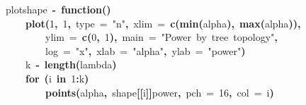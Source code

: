 \documentclass{elsarticle}
\makeatletter
\newcommand{\hlnumber}[1]{\textcolor[rgb]{0,0,0}{#1}}%
\newcommand{\hlfunctioncall}[1]{\textcolor[rgb]{.5,0,.33}{\textbf{#1}}}%
\newcommand{\hlstring}[1]{\textcolor[rgb]{.6,.6,1}{#1}}%
\newcommand{\hlkeyword}[1]{\textbf{#1}}%
\newcommand{\hlargument}[1]{\textcolor[rgb]{.69,.25,.02}{#1}}%
\newcommand{\hlassignement}[1]{\textbf{#1}}%
\newcommand{\hlsymbol}[1]{#1}%
\newcommand{\hlstd}[1]{\textcolor[rgb]{0,0,0}{#1}}%
\newenvironment{kframe}{%
 \def\FrameCommand##1{\hskip\@totalleftmargin \hskip-\fboxsep
 \colorbox{shadecolor}{##1}\hskip-\fboxsep
     \hskip-\linewidth \hskip-\@totalleftmargin \hskip\columnwidth}%
 \MakeFramed {\advance\hsize-\width
   \@totalleftmargin\z@ \linewidth\hsize
   \@setminipage}}%
 {\par\unskip\endMakeFramed}
\newenvironment{knitrout}{}{} %
\makeatother
\begin{document}
\begin{figure}
\begin{center}
\begin{knitrout}
\color{fgcolor}\begin{kframe}
\begin{flushleft}
\ttfamily\noindent
\hlsymbol{plot\usebox{\hlnormalsizeboxunderscore}shape}{\ }\hlassignement{\usebox{\hlnormalsizeboxlessthan}-}{\ }\hlkeyword{function}\hlkeyword{(}\hlkeyword{)}{\ }\hlkeyword{\usebox{\hlnormalsizeboxopenbrace}}\hspace*{\fill}\\
\hlstd{}{\ }{\ }{\ }{\ }\hlfunctioncall{plot}\hlkeyword{(}\hlnumber{1}\hlkeyword{,}{\ }\hlnumber{1}\hlkeyword{,}{\ }\hlargument{type}{\ }\hlargument{=}{\ }\hlstring{"{}n"{}}\hlkeyword{,}{\ }\hlargument{xlim}{\ }\hlargument{=}{\ }\hlfunctioncall{c}\hlkeyword{(}\hlfunctioncall{min}\hlkeyword{(}\hlsymbol{alpha}\hlkeyword{)}\hlkeyword{,}{\ }\hlfunctioncall{max}\hlkeyword{(}\hlsymbol{alpha}\hlkeyword{)}\hlkeyword{)}\hlkeyword{,}\hspace*{\fill}\\
\hlstd{}{\ }{\ }{\ }{\ }{\ }{\ }{\ }{\ }\hlargument{ylim}{\ }\hlargument{=}{\ }\hlfunctioncall{c}\hlkeyword{(}\hlnumber{0}\hlkeyword{,}{\ }\hlnumber{1}\hlkeyword{)}\hlkeyword{,}{\ }\hlargument{main}{\ }\hlargument{=}{\ }\hlstring{"{}Power{\ }by{\ }tree{\ }topology"{}}\hlkeyword{,}\hspace*{\fill}\\
\hlstd{}{\ }{\ }{\ }{\ }{\ }{\ }{\ }{\ }\hlargument{log}{\ }\hlargument{=}{\ }\hlstring{"{}x"{}}\hlkeyword{,}{\ }\hlargument{xlab}{\ }\hlargument{=}{\ }\hlstring{"{}alpha"{}}\hlkeyword{,}{\ }\hlargument{ylab}{\ }\hlargument{=}{\ }\hlstring{"{}power"{}}\hlkeyword{)}\hspace*{\fill}\\
\hlstd{}{\ }{\ }{\ }{\ }\hlsymbol{k}{\ }\hlassignement{\usebox{\hlnormalsizeboxlessthan}-}{\ }\hlfunctioncall{length}\hlkeyword{(}\hlsymbol{lambda}\hlkeyword{)}\hspace*{\fill}\\
\hlstd{}{\ }{\ }{\ }{\ }\hlkeyword{for}{\ }\hlkeyword{(}\hlsymbol{i}{\ }\hlkeyword{in}{\ }\hlnumber{1}\hlkeyword{:}\hlsymbol{k}\hlkeyword{)}{\ }\hlkeyword{\usebox{\hlnormalsizeboxopenbrace}}\hspace*{\fill}\\
\hlstd{}{\ }{\ }{\ }{\ }{\ }{\ }{\ }{\ }\hlfunctioncall{points}\hlkeyword{(}\hlsymbol{alpha}\hlkeyword{,}{\ }\hlsymbol{shape}\hlkeyword{[[}\hlsymbol{i}\hlkeyword{]}\hlkeyword{]}\hlkeyword{\usebox{\hlnormalsizeboxdollar}}\hlsymbol{power}\hlkeyword{,}{\ }\hlargument{pch}{\ }\hlargument{=}{\ }\hlnumber{16}\hlkeyword{,}{\ }\hlargument{col}{\ }\hlargument{=}{\ }\hlsymbol{i}\hlkeyword{)}\hspace*{\fill}\\

\end{flushleft}
\end{kframe}
\end{knitrout}
\end{center}
\end{figure}
\end{document}
